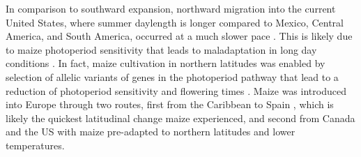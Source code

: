 \documentclass[9pt,twocolumn,twoside,lineno]{BioRxiv}
\begin{document}
In comparison to southward expansion, northward migration into the current United States, where summer daylength is longer compared to Mexico, Central America, and South America, occurred at a much slower pace \cite{Da_Fonseca2015-zh, Swarts2017-ge}. 
This is likely due to maize photoperiod sensitivity that leads to maladaptation in long day conditions \cite{Hung2012-ms}. 
In fact, maize cultivation in northern latitudes was enabled by selection of allelic variants of genes in the photoperiod pathway that lead to a reduction of photoperiod sensitivity and flowering times \cite{Liang2018-af, Guo2018-on, Coles2010-db, Huang2018-ga, Yang2013-lg, Salvi2007-ku, Wang2017-bc, Hung2012-ms}.
Maize was introduced into Europe through two routes, first from the Caribbean to Spain \cite{Brandolini1968-eu, Brandenburg2017-ii}, which is likely the quickest latitudinal change maize experienced, and second from Canada and the US with maize pre-adapted to northern latitudes and lower temperatures\cite{Brandenburg2017-ii}.
\end{document}
